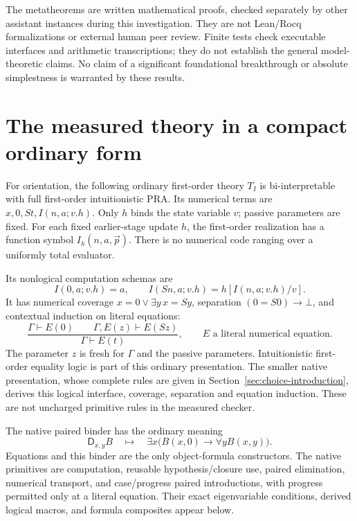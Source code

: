 The metatheorems are written mathematical proofs, checked separately by other
assistant instances during this investigation. They are not Lean/Rocq
formalizations or external human peer review. Finite tests check executable
interfaces and arithmetic transcriptions; they do not establish the general
model-theoretic claims. No claim of a significant foundational breakthrough
or absolute simplestness is warranted by these results.

\section{The measured theory in a compact ordinary form}
\label{sec:ordinary-core}

For orientation, the following ordinary first-order theory $T_I$ is
bi-interpretable with full first-order intuitionistic PRA. Its numerical
terms are $x,0,St,I(n,a;v.h)$. Only $h$ binds the state variable $v$;
passive parameters are fixed. For each fixed earlier-stage update $h$, the
first-order realization has a function symbol $I_h(n,a,\vec p)$.
There is no numerical code ranging over a uniformly total evaluator.

Its nonlogical computation schemas are
\[
 I(0,a;v.h)=a,\qquad I(Sn,a;v.h)=h[I(n,a;v.h)/v].
\]
It has numerical coverage $x=0\lor\exists y\,x=Sy$, separation
$(0=S0)\to\bot$, and contextual induction on literal equations:
\[
 \frac{\Gamma\vdash E(0)\qquad\Gamma,E(z)\vdash E(Sz)}
      {\Gamma\vdash E(t)},
 \qquad E\text{ a literal numerical equation}.
\]
The parameter $z$ is fresh for $\Gamma$ and the passive parameters.
Intuitionistic first-order equality logic is part of this ordinary
presentation. The smaller native presentation, whose complete rules are
given in Section~\ref{sec:choice-introduction}, derives this logical interface,
coverage, separation and equation induction. These are not uncharged
primitive rules in the measured checker.

The native paired binder has the ordinary meaning
\[
 \mathsf D_{x,y}B\quad\mapsto\quad
 \exists x\bigl(B(x,0)\to\forall y B(x,y)\bigr).
\]
Equations and this binder are the only object-formula constructors. The
native primitives are computation, reusable hypothesis/closure use, paired
elimination, numerical transport, and case/progress paired introductions,
with progress permitted only at a literal equation. Their exact eigenvariable
conditions, derived logical macros, and formula composites appear below.

